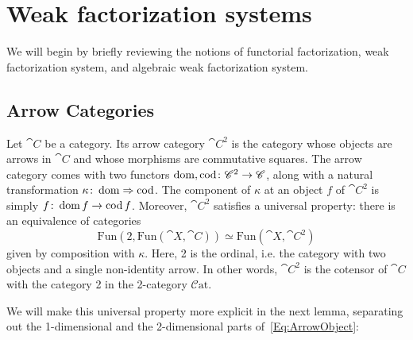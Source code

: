 
\chapter{Weak factorization systems}\label{Ch:Wfs}


We will begin by briefly reviewing the notions of functorial factorization, weak factorization system, and algebraic weak factorization system. 

\section{Arrow Categories}

Let $\cat{C}$ be a category. Its arrow category $\cat{C}^2$ is the category whose objects are arrows in $\cat{C}$ and whose morphisms are commutative squares. The arrow category comes with two functors $\operatorname{dom},\operatorname{cod}\colon \mathscr{C}^2\to\mathscr{C}$, along with a natural transformation $\kappa\colon\operatorname{dom}\Rightarrow\operatorname{cod}$. The component of $\kappa$ at an object $f$ of $\cat{C}^2$ is simply $f\colon\operatorname{dom} f\to\operatorname{cod} f$. Moreover, $\cat{C}^2$ satisfies a universal property: there is an equivalence of categories
\begin{equation}\label{Eq:ArrowObject}
	\mathrm{Fun}(2,\mathrm{Fun}(\cat{X},\cat{C}))\simeq\mathrm{Fun}(\cat{X},\cat{C}^2)
\end{equation}
given by composition with $\kappa$. Here, 2 is the ordinal, i.e. the category with two objects and a single non-identity arrow. In other words, $\cat{C}^2$ is the cotensor of $\cat{C}$ with the category 2 in the 2-category $\mathcal{C}\mathrm{at}$.

We will make this universal property more explicit in the next lemma, separating out the 1-dimensional and the 2-dimensional parts of~\eqref{Eq:ArrowObject}:

